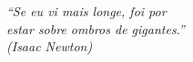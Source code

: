 
\begin{epigrafe}
	\vspace*{\fill}
	\begin{flushright}
		\textit{``Se eu vi mais longe, foi por \\
			estar sobre ombros de gigantes.''\\
			(Isaac Newton)}
	\end{flushright}
\end{epigrafe}
